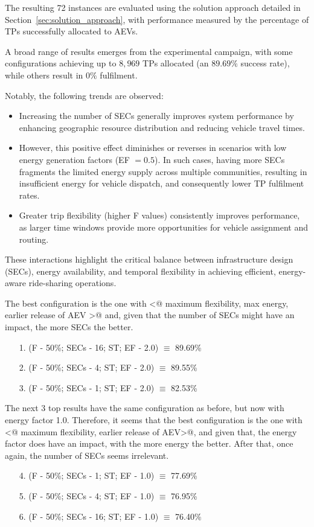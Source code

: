 The resulting 72 instances are evaluated using the solution approach detailed in Section~\ref{sec:solution_approach}, with performance measured by the percentage of TPs successfully allocated to AEVs.

A broad range of results emerges from the experimental campaign, with some configurations achieving up to $8,969$ TPs allocated (an $89.69\%$ success rate), while others result in $0\%$ fulfilment.

Notably, the following trends are observed:
\begin{itemize}
    \item Increasing the number of SECs generally improves system performance by enhancing geographic resource distribution and reducing vehicle travel times.
    \item However, this positive effect diminishes or reverses in scenarios with low energy generation factors (EF $= 0.5$). In such cases, having more SECs fragments the limited energy supply across multiple communities, resulting in insufficient energy for vehicle dispatch, and consequently lower TP fulfilment rates.
    \item Greater trip flexibility (higher F values) consistently improves performance, as larger time windows provide more opportunities for vehicle assignment and routing.
\end{itemize}

These interactions highlight the critical balance between infrastructure design (SECs), energy availability, and temporal flexibility in achieving efficient, energy-aware ride-sharing operations.
 
The best configuration is the one with \verb@<@ maximum flexibility, max energy, earlier release of AEV \verb@>@ and, given that the number of SECs might have an impact, the more SECs the better.
\begin{enumerate}
\item[1.] (F - 50\%; SECs - 16; ST; EF - 2.0) $\equiv$  89.69\%
\item[2.] (F - 50\%; SECs - 4; ST; EF - 2.0) $\equiv$ 89.55\%
\item[3.] (F - 50\%; SECs - 1; ST; EF - 2.0) $\equiv$ 82.53\%
\end{enumerate}

The next 3 top results have the same configuration as before, but now with energy factor 1.0.
Therefore, it seems that the best configuration is the one with \verb@<@ maximum flexibility, earlier release of AEV\verb@>@, and given that, the energy factor does have an impact, with the more energy the better. After that, once again, the number of SECs seems irrelevant.
\begin{enumerate}
\item[4.] (F - 50\%; SECs - 1; ST; EF - 1.0) $\equiv$ 77.69\%
\item[5.] (F - 50\%; SECs - 4; ST; EF - 1.0) $\equiv$ 76.95\%
\item[6.] (F - 50\%; SECs - 16; ST; EF - 1.0) $\equiv$ 76.40\%
\end{enumerate}


